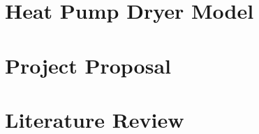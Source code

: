 \documentclass[12pt]{report}
\begin{document}





\begin{appendices}

\chapter{Heat Pump Dryer Model} \label{app:heatpumpmodel}


\chapter{Project Proposal} \label{sec:proposal}




\chapter{Literature Review} \label{sec:litreview}


\end{appendices}
\end{document}
